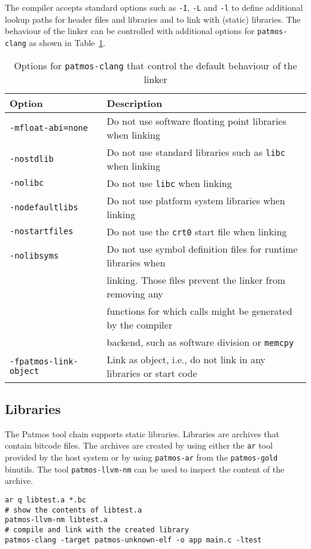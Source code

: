 The compiler accepts standard options such as \texttt{-I}, \texttt{-L} and \texttt{-l} to define additional
lookup paths for header files and libraries and to link with (static) libraries.
The behaviour of the linker can be controlled with additional options for \texttt{patmos-clang} 
as shown in Table~\ref{tab:linker_options}.

\begin{table}
\centering
\begin{tabular}{ll}
Option & Description \\ \hline
\texttt{-mfloat-abi=none} & Do not use software floating point libraries when linking \\
\texttt{-nostdlib} & Do not use standard libraries such as \texttt{libc} when linking \\
\texttt{-nolibc} & Do not use \texttt{libc} when linking \\
\texttt{-nodefaultlibs} & Do not use platform system libraries when linking\\
\texttt{-nostartfiles} & Do not use the \texttt{crt0} start file when linking \\
\texttt{-nolibsyms} & Do not use symbol definition files for runtime libraries when\\
                    & linking. Those files prevent the linker from removing any \\
		    & functions for which calls might be generated by the compiler \\
		    & backend, such as software division or \texttt{memcpy} \\
\texttt{-fpatmos-link-object} & Link as object, i.e., do not link in any libraries or start code 
\end{tabular}
\caption{Options for \texttt{patmos-clang} that control the default behaviour of the linker}
\label{tab:linker_options}
\end{table}

\subsection{Libraries}

The Patmos tool chain supports static libraries. Libraries are archives that contain
bitcode files. The archives are created by using either the \texttt{ar}
tool provided by the host system or by using \texttt{patmos-ar} from the \texttt{patmos-gold} binutils. The tool
\texttt{patmos-llvm-nm} can be used to inspect the content of the archive.

\begin{verbatim}
ar q libtest.a *.bc
# show the contents of libtest.a
patmos-llvm-nm libtest.a
# compile and link with the created library
patmos-clang -target patmos-unknown-elf -o app main.c -ltest
\end{verbatim}



